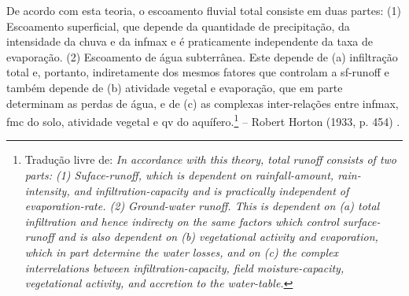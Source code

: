 \documentclass[./main.tex]{subfiles}
\begin{document}
\begin{adjustwidth}{100pt}{0pt}
\medskip
\small De acordo com esta \gls{teoria}, o escoamento fluvial total consiste em duas partes: (1) Escoamento superficial, que depende da quantidade de precipitação, da intensidade da chuva e da \gls{infmax} e é praticamente independente da taxa de evaporação. (2) Escoamento de água subterrânea. Este depende de (a) infiltração total e, portanto, indiretamente dos mesmos fatores que controlam a \gls{sf-runoff} e também depende de (b) atividade vegetal e evaporação, que em parte determinam as perdas de água, e de (c) as complexas inter-relações entre \gls{infmax}, \gls{fmc} do solo, atividade vegetal e \gls{qv} do aquífero.\footnote{Tradução livre de: \textit{In accordance with this theory, total runoff consists of two parts: (1) Suface-runoff, which is dependent on rainfall-amount, rain-intensity, and infiltration-capacity and is practically independent of evaporation-rate. (2) Ground-water runoff. This is dependent on (a) total infiltration and hence indirecty on the same factors which control surface-runoff and is also dependent on (b) vegetational activity and evaporation, which in part determine the water losses, and on (c) the complex interrelations between infiltration-capacity, field moisture-capacity, vegetational activity, and accretion to the water-table.}} -- Robert Horton (1933, p. 454) \cite{Horton1933}.
\medskip
\end{adjustwidth}
\end{document}
